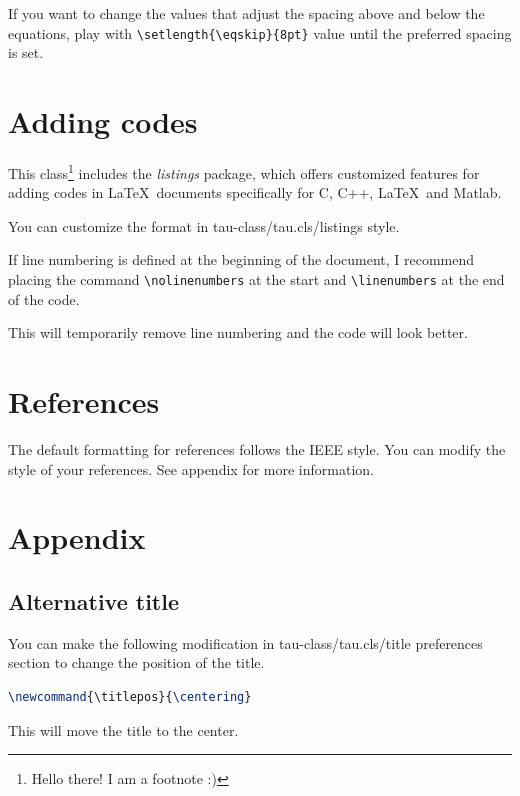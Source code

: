 \documentclass[9pt,a4paper,twocolumn,twoside]{tau-class/tau}
\begin{document}
    If you want to change the values that adjust the spacing above and below the equations, play with \verb|\setlength{\eqskip}{8pt}| value until the preferred spacing is set.
	
\section{Adding codes}
	
    This class\footnote{Hello there! I am a footnote :)} includes the \textit{listings} package, which offers customized features for adding codes in \LaTeX\ documents specifically for C, C++, \LaTeX\ and Matlab. 
	
    You can customize the format in tau-class/tau.cls/listings style.
	
    
	
    If line numbering is defined at the beginning of the document, I recommend placing the command \verb|\nolinenumbers| at the start and \verb|\linenumbers| at the end of the code. 
    
    This will temporarily remove line numbering and the code will look better.
	
\section{References}

    The default formatting for references follows the IEEE style. You can modify the style of your references. See appendix for more information.
    
\section{Appendix}

    \subsection{Alternative title}

        You can make the following modification in tau-class/tau.cls/title preferences section to change the position of the title.

\begin{lstlisting}[language=TeX, caption=Alternative title.]
\newcommand{\titlepos}{\centering}
\end{lstlisting}

        This will move the title to the center. 
\end{document}
